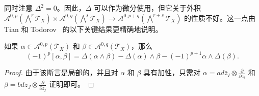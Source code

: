同时注意 $\varDelta^2=0$。因此，$\varDelta$ 可以作为微分使用，但它关于外积 $\mathcal{A}^{0,p}(\bigwedge^r \mathcal{T}_X)\times\mathcal{A}^{0,q}(\bigwedge^s \mathcal{T}_X)\rightarrow\mathcal{A}^{0,p+q}(\bigwedge^{r+s}\mathcal{T}_X)$ 的性质不好。这一点由 Tian 和 Todorov~\cite{Tian87,TT89} 的以下关键结果更精确地说明。

\begin{lemma}
    如果 $\alpha\in\mathcal{A}^{0,p}(\mathcal{T}_X)$ 和 $\beta\in\mathcal{A}^{0,q}(\mathcal{T}_X)$，那么\[
        {(-1)}^p [\alpha,\beta]=\varDelta(\alpha\wedge\beta)-\varDelta(\alpha)\wedge\beta-{(-1)}^{p+1} \alpha\wedge\varDelta(\beta).
    \]
\end{lemma}

\begin{proof}
    由于该断言是局部的，并且对 $\alpha$ 和 $\beta$ 具有加性，只需对 $\alpha=ad\bar{z}_I\otimes\frac{\partial}{\partial z_i}$ 和 $\beta=bd\bar{z}_J\otimes\frac{\partial}{\partial z_j}$ 证明即可。


\end{proof}
